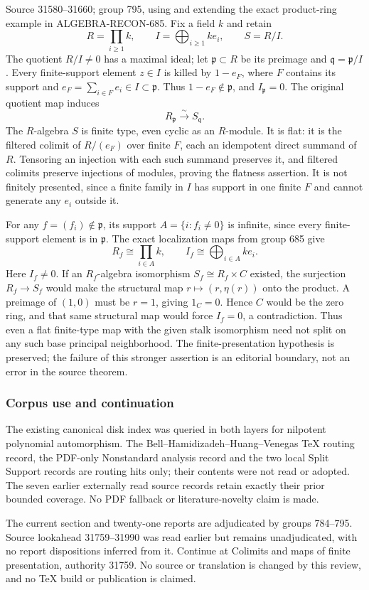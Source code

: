 Source 31580--31660; group 795, using and extending the exact product-ring example in ALGEBRA-RECON-685. Fix a field \(k\) and retain \[
R=\prod_{i\ge1}k,\qquad I=\bigoplus_{i\ge1}ke_i,\qquad S=R/I.
\] The quotient \(R/I\ne0\) has a maximal ideal; let \(\mathfrak p\subset R\) be its preimage and \(\mathfrak q=\mathfrak p/I\). Every finite-support element \(z\in I\) is killed by \(1-e_F\), where \(F\) contains its support and \(e_F=\sum_{i\in F}e_i\in I\subset\mathfrak p\). Thus \(1-e_F\notin\mathfrak p\), and \(I_{\mathfrak p}=0\). The original quotient map induces \[
R_{\mathfrak p}\xrightarrow{\sim}S_{\mathfrak q}.
\] The \(R\)-algebra \(S\) is finite type, even cyclic as an \(R\)-module. It is flat: it is the filtered colimit of \(R/(e_F)\) over finite \(F\), each an idempotent direct summand of \(R\). Tensoring an injection with each such summand preserves it, and filtered colimits preserve injections of modules, proving the flatness assertion. It is not finitely presented, since a finite family in \(I\) has support in one finite \(F\) and cannot generate any \(e_i\) outside it.

For any \(f=(f_i)\notin\mathfrak p\), its support \(A=\{i:f_i\ne0\}\) is infinite, since every finite-support element is in \(\mathfrak p\). The exact localization maps from group 685 give \[
R_f\cong\prod_{i\in A}k,\qquad I_f\cong\bigoplus_{i\in A}ke_i.
\] Here \(I_f\ne0\). If an \(R_f\)-algebra isomorphism \(S_f\cong R_f\times C\) existed, the surjection \(R_f\to S_f\) would make the structural map \(r\mapsto(r,\eta(r))\) onto the product. A preimage of \((1,0)\) must be \(r=1\), giving \(1_C=0\). Hence \(C\) would be the zero ring, and that same structural map would force \(I_f=0\), a contradiction. Thus even a flat finite-type map with the given stalk isomorphism need not split on any such base principal neighborhood. The finite-presentation hypothesis is preserved; the failure of this stronger assertion is an editorial boundary, not an error in the source theorem.

\subsubsection{Corpus use and continuation}\label{algebra-proof-035-corpus-use-and-continuation}

The existing canonical disk index was queried in both layers for nilpotent polynomial automorphism. The Bell--Hamidizadeh--Huang--Venegas TeX routing record, the PDF-only Nonstandard analysis record and the two local Split Support records are routing hits only; their contents were not read or adopted. The seven earlier externally read source records retain exactly their prior bounded coverage. No PDF fallback or literature-novelty claim is made.

The current section and twenty-one reports are adjudicated by groups 784--795. Source lookahead 31759--31990 was read earlier but remains unadjudicated, with no report dispositions inferred from it. Continue at Colimits and maps of finite presentation, authority 31759. No source or translation is changed by this review, and no TeX build or publication is claimed.
